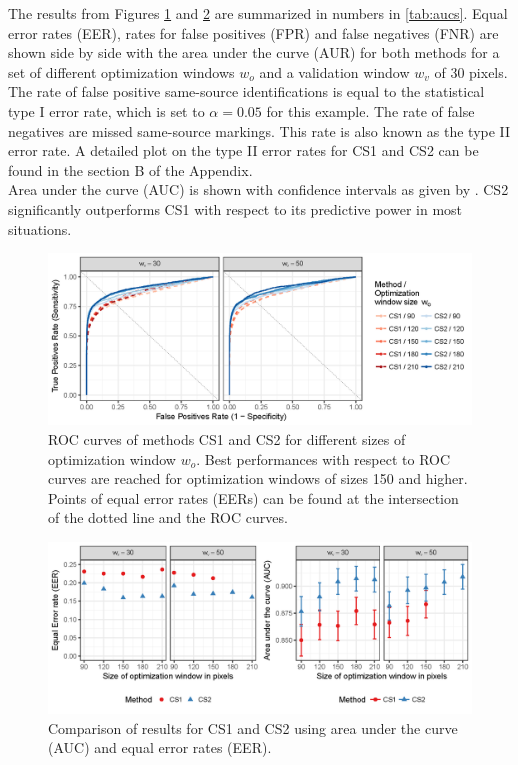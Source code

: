 \documentclass[12pt]{article}
\begin{document}
The results from Figures \ref{fig:roc} and \ref{fig:eer} are summarized
in numbers in \autoref{tab:aucs}. Equal error rates (EER), rates for
false positives (FPR) and false negatives (FNR) are shown side by side
with the area under the curve (AUR) for both methods for a set of
different optimization windows \(w_o\) and a validation window \(w_v\)
of 30 pixels. The rate of false positive same-source identifications is
equal to the statistical type I error rate, which is set to
\(\alpha = 0.05\) for this example. The rate of false negatives are
missed same-source markings. This rate is also known as the type II
error rate. A detailed plot on the type II error rates for CS1 and CS2 
can be found in the section B %
of the Appendix.\\
Area under the curve (AUC) is shown with confidence intervals as given
by \citet{delong}. CS2 significantly outperforms CS1 with respect to its
predictive power in most situations.

\begin{figure}

{\centering \includegraphics[width=\textwidth]{figures/roc-1} 

}

\caption{ROC curves of methods CS1 and CS2 for different sizes of optimization window $w_o$. Best performances with respect to  ROC curves are reached for optimization windows of sizes 150 and higher. Points of equal error rates (EERs) can be found at the intersection of the dotted line and the ROC curves.}\label{fig:roc}
\end{figure}

\begin{figure}

{\centering \includegraphics[width=\textwidth]{figures/eer-1} 

}

\caption{Comparison of results for CS1 and CS2 using area under the curve (AUC) and equal error rates (EER). }\label{fig:eer}
\end{figure}
\end{document}
